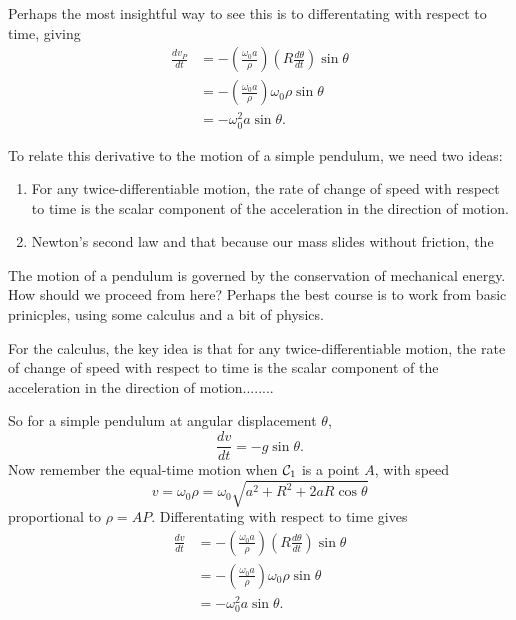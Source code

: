 \documentclass{ximera}
\begin{document}
Perhaps the most insightful way to see this is to differentating with respect to time, giving
\begin{align*}
   \frac{dv_P}{dt} &= - \left( \frac{\omega_0 a}{\rho} \right)\left( R\frac{d\theta}{dt} \right)\sin\theta \\
                       &=  - \left( \frac{\omega_0 a}{\rho} \right) \omega_0 \rho \sin\theta \\
                       &= -\omega_0^2 a \sin\theta .
\end{align*}

To relate this derivative to the motion of a simple pendulum, we need two ideas:

\begin{enumerate}
\item For any twice-differentiable motion, the rate of change of speed with respect to time is the scalar component of the acceleration in the direction of motion.

\item Newton's second law and that because our mass slides without friction, the 
\end{enumerate}

The motion of a pendulum is governed by the conservation of mechanical energy. How should we proceed from here? Perhaps the best course is to work from basic prinicples, using some calculus and a bit of physics.

For the calculus, the key idea is that for any twice-differentiable motion, the rate of change of speed with respect to time is the scalar component of the acceleration in the direction of motion........

So for a simple pendulum at angular displacement $\theta$,
\[
   \frac{dv}{dt} = -g\sin\theta .
\]
Now remember the equal-time motion when ${\cal C}_1$ is a point $A$, with speed %
\[
       v = \omega_0 \rho = \omega_0 \sqrt{a^2 + R^2 + 2aR\cos\theta} 
\]
proportional to $\rho = AP$. Differentating with respect to time gives
\begin{align*}
   \frac{dv}{dt} &= - \left( \frac{\omega_0 a}{\rho} \right)\left( R\frac{d\theta}{dt} \right)\sin\theta \\
                       &=  - \left( \frac{\omega_0 a}{\rho} \right) \omega_0 \rho \sin\theta \\
                       &= -\omega_0^2 a \sin\theta .
\end{align*}


\end{document}
